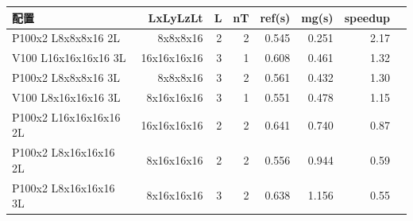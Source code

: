 \begin{tabular}{l|rrrrrrr}
\hline
配置 & LxLyLzLt & L & nT & ref(s) & mg(s) & speedup \\
\hline
P100x2 L8x8x8x16 2L & 8x8x8x16 & 2 & 2 & 0.545 & 0.251 & 2.17 \\
V100 L16x16x16x16 3L & 16x16x16x16 & 3 & 1 & 0.608 & 0.461 & 1.32 \\
P100x2 L8x8x8x16 3L & 8x8x8x16 & 3 & 2 & 0.561 & 0.432 & 1.30 \\
V100 L8x16x16x16 3L & 8x16x16x16 & 3 & 1 & 0.551 & 0.478 & 1.15 \\
P100x2 L16x16x16x16 2L & 16x16x16x16 & 2 & 2 & 0.641 & 0.740 & 0.87 \\
P100x2 L8x16x16x16 2L & 8x16x16x16 & 2 & 2 & 0.556 & 0.944 & 0.59 \\
P100x2 L8x16x16x16 3L & 8x16x16x16 & 3 & 2 & 0.638 & 1.156 & 0.55 \\
\hline
\end{tabular}
